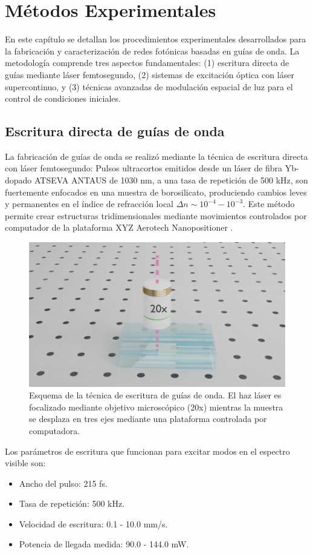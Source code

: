 \chapter{Métodos Experimentales}

En este capítulo se detallan los procedimientos experimentales desarrollados para la fabricación y caracterización de redes fotónicas basadas en guías de onda. La metodología comprende tres aspectos fundamentales: (1) escritura directa de guías mediante láser femtosegundo, (2) sistemas de excitación óptica con láser supercontinuo, y (3) técnicas avanzadas de modulación espacial de luz para el control de condiciones iniciales.


\section{Escritura directa de guías de onda \label{cap:fs}}

La fabricación de guías de onda se realizó mediante la técnica de escritura directa con láser femtosegundo: Pulsos ultracortos emitidos desde un láser de fibra Yb-dopado ATSEVA ANTAUS de 1030 nm, a una tasa de repetición de 500 kHz, son fuertemente enfocados en una muestra de borosilicato, produciendo cambios leves y permanentes en el índice de refracción local $\Delta n \sim 10^{-4}-10^{-3}$. Este método permite crear estructuras tridimensionales mediante movimientos controlados por computador de la plataforma XYZ Aerotech Nanopositioner \citep{femto_writing}.

\begin{figure}[H]
    \centering
    \includegraphics[width=0.6\linewidth, trim={18cm 4cm 15cm 6cm},clip]{media/fabrication1}
    \caption[Esquema de la técnica de escritura de guías de onda.]{Esquema de la técnica de escritura de guías de onda. El haz láser es focalizado mediante objetivo microscópico (20x) mientras la muestra se desplaza en tres ejes mediante una plataforma controlada por computadora.}
\end{figure}

Los parámetros de escritura que funcionan para excitar modos en el espectro visible son:
\begin{itemize}
	\item Ancho del pulso: 215 fs.
    \item Tasa de repetición: 500 kHz.
    \item Velocidad de escritura: 0.1 - 10.0 mm/s.
    \item Potencia de llegada medida: 90.0 - 144.0 mW.
\end{itemize}

